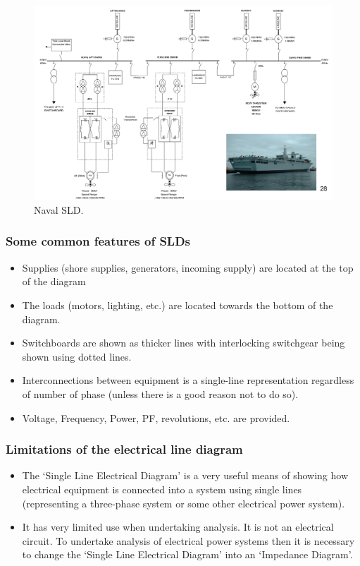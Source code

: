 \documentclass[class=report, crop=false, 12pt,a4paper]{standalone}
\begin{document}
\begin{figure}[H]
	\centering
	\includegraphics[width = \textwidth]{../img/figure5.png}
	\caption{Naval SLD.}
\end{figure}
\subsubsection{Some common features of SLDs}
\begin{itemize}
	\item Supplies (shore supplies, generators, incoming supply) are located at the top of the diagram
	\item The loads (motors, lighting, etc.) are located towards the bottom of the diagram.
	\item Switchboards are shown as thicker lines with interlocking switchgear being shown using dotted lines.
	\item Interconnections between equipment is a single-line representation regardless of number of phase (unless there is a good reason not to do so).
	\item Voltage, Frequency, Power, PF, revolutions, etc. are provided.
\end{itemize}
\subsubsection{Limitations of the electrical line diagram}
\begin{itemize}
	\item The `Single Line Electrical Diagram' is a very useful means of showing how electrical equipment is connected into a system using single lines (representing a three-phase system or some other electrical power system).
	\item It has very limited use when undertaking analysis. It is not an electrical circuit. To undertake analysis of electrical power systems then it is necessary to change the `Single Line Electrical Diagram' into an `Impedance Diagram'.
\end{itemize}
\end{document}
